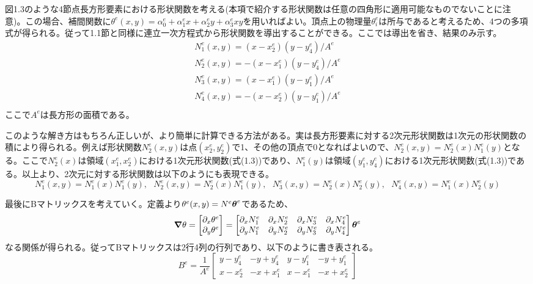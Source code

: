 \documentclass[dvipdfmx, 9pt, a4paper]{jsarticle}
\numberwithin{equation}{section}
\newcommand{\bm}[1]{{\mbox{\boldmath $#1$}}}
\newcommand{\bnabla}{\bm \nabla}
\begin{document}
図1.3のような4節点長方形要素における形状関数を考える(本項で紹介する形状関数は任意の四角形に適用可能なものでないことに注意)。この場合、補間関数に$\theta^e(x, y)=\alpha^e_0 + \alpha^e_1x+\alpha^e_2y+\alpha^e_3xy$を用いればよい。頂点上の物理量$\theta^e_i$は所与であると考えるため、4つの多項式が得られる。従って1.1節と同様に連立一次方程式から形状関数を導出することができる。ここでは導出を省き、結果のみ示す。
\begin{equation}
\begin{array}{l}
N^e_1(x,y)=(x-x^e_2)(y-y^e_4)/A^e \\
N^e_2(x,y)=-(x-x^e_1)(y-y^e_4)/A^e \\
N^e_3(x,y)=(x-x^e_1)(y-y^e_1)/A^e \\
N^e_4(x,y)=-(x-x^e_2)(y-y^e_1)/A^e \\
\end{array}
\end{equation}
ここで$A^e$は長方形の面積である。\par
このような解き方はもちろん正しいが、より簡単に計算できる方法がある。実は長方形要素に対する2次元形状関数は1次元の形状関数の積により得られる。例えば形状関数$N^e_2(x, y)$は点$(x^e_2, y^e_2)$で1、その他の頂点で0となればよいので、$N^e_2(x, y)=N^e_2(x)N^e_1(y)$となる。ここで$N^e_2(x)$は領域$(x^e_1, x^e_2)$における1次元形状関数(式(1.3))であり、$N^e_1(y)$は領域$(y^e_1, y^e_4)$における1次元形状関数(式(1.3))である。以上より、2次元に対する形状関数は以下のようにも表現できる。
\begin{equation}
N^e_1(x, y)=N^e_1(x)N^e_1(y),~~~N^e_2(x, y)=N^e_2(x)N^e_1(y),~~~N^e_3(x, y)=N^e_2(x)N^e_2(y),~~~N^e_4(x, y)=N^e_1(x)N^e_2(y)
\end{equation}\par
最後にBマトリックスを考えていく。定義より$\theta^e(x, y)=N^e\bm \theta^e$であるため、
\begin{equation}
\bnabla \theta=
\begin{bmatrix}
\partial_x \theta^e \\ \partial_y \theta^e
\end{bmatrix}=
\begin{bmatrix}
\partial_x N^e_1 & \partial_x N^e_2 & \partial_x N^e_3 & \partial_x N^e_4 \\
\partial_y N^e_1 & \partial_y N^e_2 & \partial_y N^e_3 & \partial_y N^e_4
\end{bmatrix}\bm \theta^e \notag
\end{equation}
なる関係が得られる。従ってBマトリックスは2行4列の行列であり、以下のように書き表される。
\begin{equation}
B^e=\frac{1}{A^e}
\begin{bmatrix}
y-y^e_4 & -y+y^e_4 & y-y^e_1 & -y+y^e_1 \\
x-x^e_2 & -x+x^e_1 & x-x^e_1 & -x+x^e_2
\end{bmatrix}
\end{equation}
\end{document}
